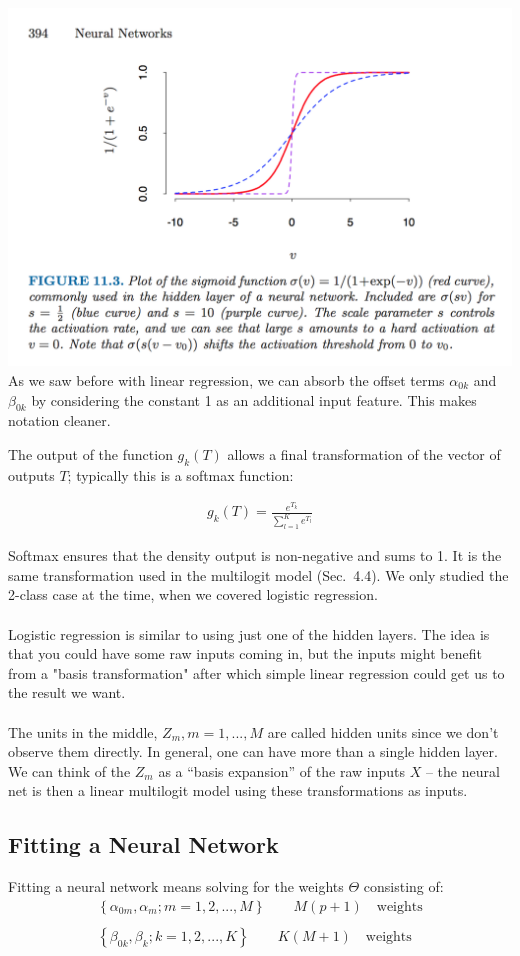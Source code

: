 \documentclass[a4paper]{article}
\begin{document}
\includegraphics[width=\textwidth]{SigmoidNN.png}
As we saw before with linear regression, we can absorb the offset terms $\alpha_{0k}$ and $\beta_{0k}$ by considering the constant 1 as an additional input feature. This makes notation cleaner.

The output of the function $g_k(T)$ allows a final transformation of the vector of outputs $T$; typically this is a softmax function:

\begin{align*}
g_k(T) = \frac{e^{T_k}}{\sum_{l=1}^K e^{T_l}}
\end{align*}

Softmax ensures that the density output is non-negative and sums to 1. It is the same transformation used in the multilogit model (Sec.\ 4.4). We only studied the 2-class case at the time, when we covered logistic regression.
\\ \\
Logistic regression is similar to using just one of the hidden layers.  The idea is that you could have some raw inputs coming in, but the inputs might benefit from a "basis transformation" after which simple linear regression could get us to the result we want.
\\ \\
The units in the middle, $Z_m, m=1,...,M$ are called hidden units since we don't observe them directly. In general, one can have more than a single hidden layer. We can think of the $Z_m$ as a ``basis expansion'' of the raw inputs $X$ -- the neural net is then a linear multilogit model using these transformations as inputs.

\subsection{Fitting a Neural Network}
Fitting a neural network means solving for the weights $\Theta$ consisting of:
\begin{align*}
\left \{ \alpha_{0m}, \alpha_m; m=1,2,...,M \right \} \qquad M(p+1)\quad  \text{weights}
\\ \\
\left \{\beta_{0k}, \beta_k; k=1,2,...,K \right \} \qquad K(M+1) \quad \text{weights}
\end{align*}
\end{document}

